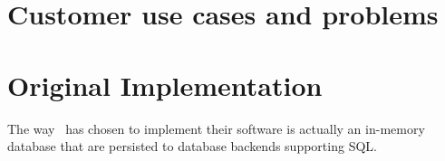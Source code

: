 \section{Customer use cases and problems}
\label{sec:Customer use cases and problems}

\section{Original Implementation}
\label{sec:Original Implementation}

The way \genus~has chosen to implement their software is actually an in-memory database that are persisted to database backends supporting SQL. 


